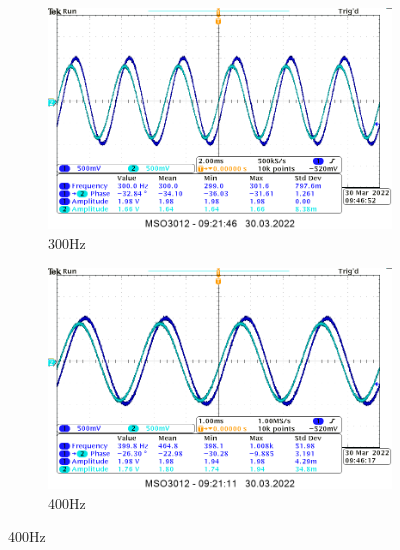 \begin{itemize}
{    \begin{figure}[H]
        \centering
        \begin{subfigure}[h]{0.4\textwidth}
            \includegraphics[width=\textwidth]{img_osciloscope/CR/CR_300Hz_cropped.png}
            \caption*{300Hz}
        \end{subfigure}
        \begin{subfigure}[h]{0.4\textwidth}
            \includegraphics[width=\textwidth]{img_osciloscope/CR/CR_400Hz_cropped.png}
            \caption*{400Hz}
        \end{subfigure}
    \end{figure}
    
}
\end{itemize}
